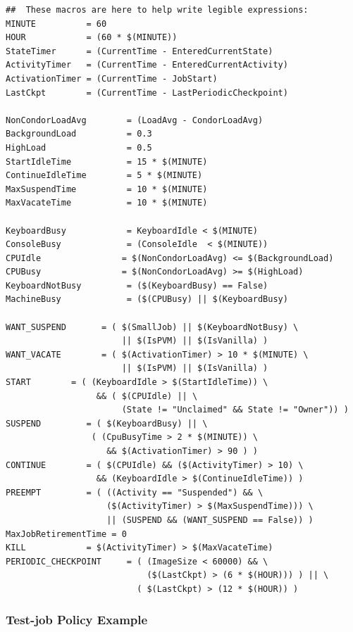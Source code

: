 \begin{verbatim}
##  These macros are here to help write legible expressions:
MINUTE          = 60
HOUR            = (60 * $(MINUTE))
StateTimer      = (CurrentTime - EnteredCurrentState)
ActivityTimer   = (CurrentTime - EnteredCurrentActivity)
ActivationTimer = (CurrentTime - JobStart)
LastCkpt        = (CurrentTime - LastPeriodicCheckpoint)

NonCondorLoadAvg        = (LoadAvg - CondorLoadAvg)
BackgroundLoad          = 0.3
HighLoad                = 0.5
StartIdleTime           = 15 * $(MINUTE)
ContinueIdleTime        = 5 * $(MINUTE)
MaxSuspendTime          = 10 * $(MINUTE)
MaxVacateTime           = 10 * $(MINUTE)

KeyboardBusy            = KeyboardIdle < $(MINUTE)
ConsoleBusy             = (ConsoleIdle  < $(MINUTE))
CPUIdle                = $(NonCondorLoadAvg) <= $(BackgroundLoad)
CPUBusy                = $(NonCondorLoadAvg) >= $(HighLoad)
KeyboardNotBusy         = ($(KeyboardBusy) == False)
MachineBusy             = ($(CPUBusy) || $(KeyboardBusy)

WANT_SUSPEND       = ( $(SmallJob) || $(KeyboardNotBusy) \
                       || $(IsPVM) || $(IsVanilla) )
WANT_VACATE        = ( $(ActivationTimer) > 10 * $(MINUTE) \
                       || $(IsPVM) || $(IsVanilla) )
START        = ( (KeyboardIdle > $(StartIdleTime)) \
                  && ( $(CPUIdle) || \
                       (State != "Unclaimed" && State != "Owner")) )
SUSPEND         = ( $(KeyboardBusy) || \
                 ( (CpuBusyTime > 2 * $(MINUTE)) \
                    && $(ActivationTimer) > 90 ) )
CONTINUE        = ( $(CPUIdle) && ($(ActivityTimer) > 10) \
                  && (KeyboardIdle > $(ContinueIdleTime)) )
PREEMPT	        = ( ((Activity == "Suspended") && \
                    ($(ActivityTimer) > $(MaxSuspendTime))) \
                    || (SUSPEND && (WANT_SUSPEND == False)) )
MaxJobRetirementTime = 0
KILL            = $(ActivityTimer) > $(MaxVacateTime)
PERIODIC_CHECKPOINT     = ( (ImageSize < 60000) && \
                            ($(LastCkpt) > (6 * $(HOUR))) ) || \ 
                          ( $(LastCkpt) > (12 * $(HOUR)) )
\end{verbatim}

\subsubsection{\label{sec:Test-job Policy Example}
Test-job Policy Example}

